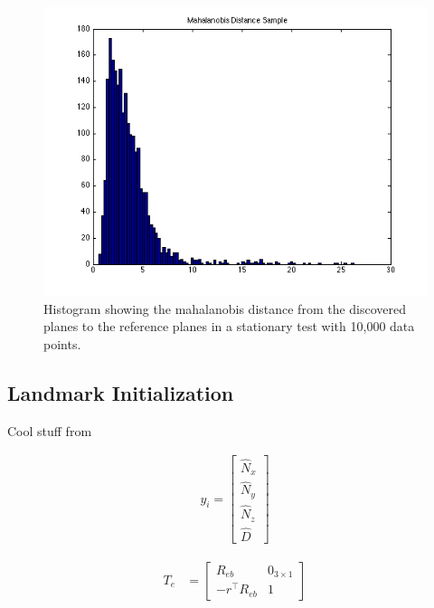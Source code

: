 \documentclass[]{article}
\begin{document}
{%


\begin{figure}[tb]
	\begin{center}
		\includegraphics[width = \textwidth]{malhala_hist_100bins_10000datapoints_notmoving22}
	\end{center}
	\caption{Histogram showing the mahalanobis distance from the discovered planes to the reference planes in a stationary test with 10,000 data points.}
	\label{fig:mahaldisthist}
\end{figure}


\subsection{Landmark Initialization} %
\label{sub:landmark_initialization}

Cool stuff from \cite{Sola2013}

\begin{align}
	y_i = 
	\left[
	\begin{matrix}
		\hat{N}_x \\
		\hat{N}_y \\
		\hat{N}_z \\
		\hat{D}
	\end{matrix}
	\right]
\end{align}

\begin{align}
	T_e &= 
	\left[
	\begin{matrix}
		R_{eb} 			& 0_{3\times1} \\
		-r^\top R_{eb}	& 1
	\end{matrix}
	\right]
\end{align}

}
\end{document}
